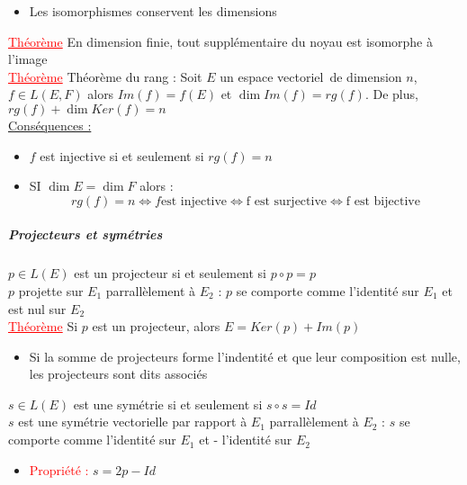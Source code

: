 \documentclass[a4paper, french]{article}
\newcommand{\ev}{espace vectoriel}
\newcommand{\thm}{\textcolor{red}{\underline{Théorème} }}
\newcommand{\ppt}{\textcolor{red}{Propriété : }}
\begin{document}
	\begin{itemize}
	  \item Les isomorphismes conservent les dimensions
	\end{itemize}
	 \thm En dimension finie, tout supplémentaire du noyau est isomorphe à l'image \\
	 \thm Théorème du rang : Soit $E$ un \ev \, de dimension $n$, $f\in L(E,F)$ alors $Im(f)=f(E)$ et $\dim Im(f)=rg(f)$. De plus, $rg(f)+\dim Ker(f)=n$ \\
	 \underline{Conséquences :}
	\begin{itemize}
 		\item $f$ est injective si et seulement si $rg(f)=n$
 		\item SI $\dim E = \dim F$ alors :
				 $$rg(f)=n \iff f \text{est injective} \iff \text{f est surjective} \iff \text{f est bijective}$$
	\end{itemize}
	\subparagraph{Projecteurs et symétries \\}
	$p \in L(E)$ est un projecteur si et seulement si $p\circ p=p$ \\
	$p$ projette sur $E_1$ parrallèlement à $E_2$ : $p$ se comporte comme l'identité sur $E_1$ et est nul sur $E_2$ \\
	 \thm Si $p$ est un projecteur, alors $E=Ker(p)+Im(p)$
	\begin{itemize}
 		\item Si la somme de projecteurs forme l'indentité et que leur composition est nulle, les projecteurs sont dits associés
	\end{itemize}
	$s \in L(E)$ est une symétrie si et seulement si $s\circ s=Id$ \\
	$s$ est une symétrie vectorielle par rapport à $E_1$ parrallèlement à $E_2$ : $s$ se comporte comme l'identité sur $E_1$ et - l'identité sur $E_2$ \\
	\begin{itemize}
 		\item\ppt $s=2p-Id$
	\end{itemize}
\end{document}
